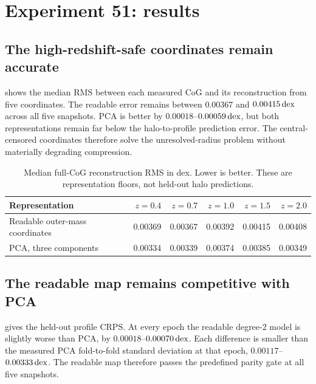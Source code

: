 \section{Experiment 51: results}
\label{sec:exp51_results}

\subsection{The high-redshift-safe coordinates remain accurate}

 shows the median RMS between each measured
CoG and its reconstruction from five coordinates. The readable error remains
between $0.00367$ and $0.00415\,\mathrm{dex}$ across all five snapshots. PCA is better by
$0.00018$--$0.00059\,\mathrm{dex}$, but both representations remain far below the
halo-to-profile prediction error. The central-censored coordinates therefore
solve the unresolved-radius problem without materially degrading compression.

\begin{table}[htbp]
  \centering
  \caption{Median full-CoG reconstruction RMS in dex. Lower is better. These
  are representation floors, not held-out halo predictions.}
  \label{tab:representation_redshift}
  \begin{tabular}{@{}lrrrrr@{}}
    \toprule
    Representation & $z=0.4$ & $z=0.7$ & $z=1.0$ & $z=1.5$ & $z=2.0$ \\
    \midrule
    Readable outer-mass coordinates & 0.00369 & 0.00367 & 0.00392 & 0.00415 & 0.00408 \\
    PCA, three components & 0.00334 & 0.00339 & 0.00374 & 0.00385 & 0.00349 \\
    \bottomrule
  \end{tabular}
\end{table}

\subsection{The readable map remains competitive with PCA}

 gives the held-out profile CRPS. At every epoch the
readable degree-2 model is slightly worse than PCA, by $0.00018$--$0.00070\,\mathrm{dex}$.
Each difference is smaller than the measured PCA fold-to-fold standard
deviation at that epoch, $0.00117$--$0.00333\,\mathrm{dex}$. The readable map therefore
passes the predefined parity gate at all five snapshots.

